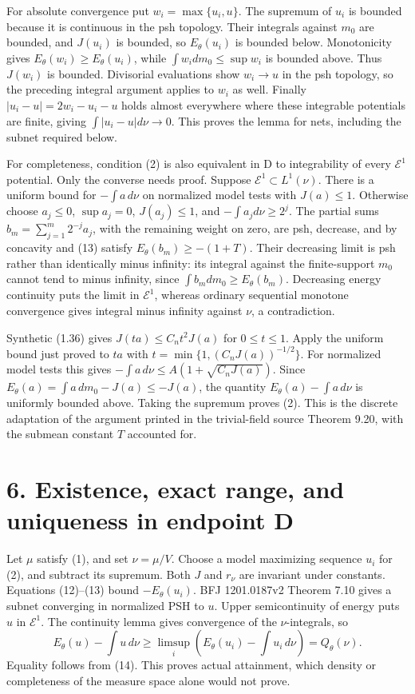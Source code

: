 \documentclass[11pt]{article}
\begin{document}
For absolute convergence put \(w_i=\max\{u_i,u\}\). The supremum of \(u_i\) is bounded because it is continuous in the psh topology. Their integrals against \(m_0\) are bounded, and \(J(u_i)\) is bounded, so \(E_\theta(u_i)\) is bounded below. Monotonicity gives \(E_\theta(w_i)\geq E_\theta(u_i)\), while \(\int w_i dm_0\leq\sup w_i\) is bounded above. Thus \(J(w_i)\) is bounded. Divisorial evaluations show \(w_i\to u\) in the psh topology, so the preceding integral argument applies to \(w_i\) as well. Finally \(|u_i-u|=2w_i-u_i-u\) holds almost everywhere where these integrable potentials are finite, giving \(\int|u_i-u|d\nu\to0\). This proves the lemma for nets, including the subnet required below.

For completeness, condition (2) is also equivalent in D to integrability of every \(\mathcal E^1\) potential. Only the converse needs proof. Suppose \(\mathcal E^1\subset L^1(\nu)\). There is a uniform bound for \(-\int a\,d\nu\) on normalized model tests with \(J(a)\leq1\). Otherwise choose \(a_j\leq0\), \(\sup a_j=0\), \(J(a_j)\leq1\), and \(-\int a_jd\nu\geq2^j\). The partial sums \(b_m=\sum_{j=1}^m2^{-j}a_j\), with the remaining weight on zero, are psh, decrease, and by concavity and (13) satisfy \(E_\theta(b_m)\geq-(1+T)\). Their decreasing limit is psh rather than identically minus infinity: its integral against the finite-support \(m_0\) cannot tend to minus infinity, since \(\int b_mdm_0\geq E_\theta(b_m)\). Decreasing energy continuity puts the limit in \(\mathcal E^1\), whereas ordinary sequential monotone convergence gives integral minus infinity against \(\nu\), a contradiction.

Synthetic (1.36) gives \(J(ta)\leq C_nt^2J(a)\) for \(0\leq t\leq1\). Apply the uniform bound just proved to \(ta\) with \(t=\min\{1,(C_nJ(a))^{-1/2}\}\). For normalized model tests this gives \(-\int a\,d\nu\leq A(1+\sqrt{C_nJ(a)})\). Since \(E_\theta(a)=\int a\,dm_0-J(a)\leq-J(a)\), the quantity \(E_\theta(a)-\int a\,d\nu\) is uniformly bounded above. Taking the supremum proves (2). This is the discrete adaptation of the argument printed in the trivial-field source Theorem 9.20, with the submean constant \(T\) accounted for.

\section*{6. Existence, exact range, and uniqueness in endpoint D}

Let \(\mu\) satisfy (1), and set \(\nu=\mu/V\). Choose a model maximizing sequence \(u_i\) for (2), and subtract its supremum. Both \(J\) and \(r_\nu\) are invariant under constants. Equations (12)--(13) bound \(-E_\theta(u_i)\). BFJ 1201.0187v2 Theorem 7.10 gives a subnet converging in normalized PSH to \(u\). Upper semicontinuity of energy puts \(u\) in \(\mathcal E^1\). The continuity lemma gives convergence of the \(\nu\)-integrals, so
\[
 E_\theta(u)-\int u\,d\nu
 \geq\limsup_i\left(E_\theta(u_i)-\int u_i\,d\nu\right)
 =Q_\theta(\nu).
 \tag{16}
\]
Equality follows from (14). This proves actual attainment, which density or completeness of the measure space alone would not prove.
\end{document}
